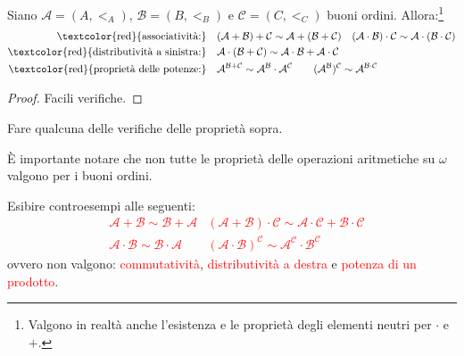 \documentclass[11pt]{scrartcl}
\begin{document}
\begin{proposition}
	Siano $\mathcal{A} = (A,<_A)$, $\mathcal{B} = (B,<_B)$ e $\mathcal{C} = (C,<_C)$ buoni ordini. Allora:\footnote{Valgono in realtà anche l'esistenza e le proprietà degli elementi neutri per $\cdot$ e $+$.}
	\[\begin{split}
		\text{\textcolor{red}{associatività:}} &\quad (\mathcal A + \mathcal B) + \mathcal C \sim \mathcal A + (\mathcal B + \mathcal C) \quad (\mathcal A \cdot \mathcal B) \cdot \mathcal C \sim \mathcal A \cdot (\mathcal B \cdot \mathcal C)\\
		\text{\textcolor{red}{distributività a sinistra:}} &\quad  \mathcal A \cdot (\mathcal B + \mathcal C) \sim \mathcal A \cdot \mathcal B + \mathcal A \cdot \mathcal C \\
		\text{\textcolor{red}{proprietà delle potenze:}} &\quad {\mathcal A}^{\mathcal B + \mathcal C} \sim \mathcal A^{\mathcal B} \cdot {\mathcal A}^{\mathcal C} \qquad ({\mathcal A}^{\mathcal B})^{\mathcal{C}} \sim {\mathcal A}^{\mathcal B \cdot \mathcal C}
	\end{split}\]
\end{proposition}

\begin{proof}
	Facili verifiche.
\end{proof}

\begin{exercise}
	Fare qualcuna delle verifiche delle proprietà sopra.
\end{exercise}

È importante notare che non tutte le proprietà delle operazioni aritmetiche su $\omega$ valgono per i buoni ordini.

\begin{exercise}
	Esibire controesempi alle seguenti:
	\textcolor{red}{\begin{align*}
		& \mathcal A + \mathcal B \sim \mathcal B + \mathcal A &(\mathcal A + \mathcal B) \cdot \mathcal C \sim \mathcal A \cdot \mathcal C + \mathcal B \cdot \mathcal C \\
		& \mathcal A \cdot \mathcal B \sim \mathcal B \cdot \mathcal A &(\mathcal A \cdot \mathcal B)^{\mathcal C} \sim \mathcal A^{\mathcal C} \cdot \mathcal B^{\mathcal C}
	\end{align*}}
	ovvero non valgono: \textcolor{red}{commutatività}, \textcolor{red}{distributività a destra} e \textcolor{red}{potenza di un prodotto}.
\end{exercise}
\end{document}
